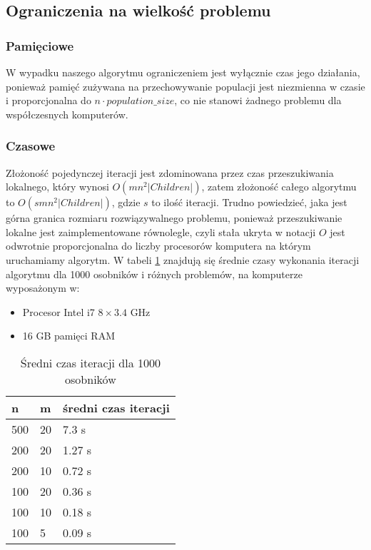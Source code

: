\documentclass[11pt, a4wide]{article}
\begin{document}
\subsection{Ograniczenia na wielkość problemu}
\subsubsection{Pamięciowe}
W wypadku naszego algorytmu ograniczeniem jest wyłącznie czas jego działania, ponieważ
pamięć zużywana na przechowywanie populacji jest niezmienna w czasie i proporcjonalna do
$n \cdot population\_size$, co nie stanowi żadnego problemu dla współczesnych komputerów.
\subsubsection{Czasowe}
Złożoność pojedynczej iteracji jest zdominowana przez czas przeszukiwania lokalnego, który wynosi
$O(mn^2|Children|)$, zatem złożoność całego algorytmu to $O(smn^2|Children|)$, gdzie $s$ to ilość iteracji.
Trudno powiedzieć, jaka jest górna granica rozmiaru rozwiązywalnego problemu, ponieważ przeszukiwanie 
lokalne jest zaimplementowane równolegle, czyli stała ukryta w notacji $O$ jest odwrotnie proporcjonalna
do liczby procesorów komputera na którym uruchamiamy algorytm. W tabeli \ref{sredniaiteracja} znajdują się 
średnie czasy wykonania iteracji algorytmu dla 1000 osobników i różnych problemów, na komputerze wyposażonym w:
\begin{itemize}
  \item Procesor Intel i7 $8 \times \text{3.4 GHz}$
  \item 16 GB pamięci RAM
\end{itemize}

\begin{table}[H]
\caption{Średni czas iteracji dla 1000 osobników}
\label{sredniaiteracja}
\begin{center}
\begin{tabular}{|l|l|l|}
  \hline
  n & m & średni czas iteracji \\
  \hline
  500 & 20 & 7.3 s \\
  200 & 20 & 1.27 s \\
  200 & 10 & 0.72 s \\
  100 & 20 & 0.36 s \\
  100 & 10 & 0.18 s \\
  100 & 5 & 0.09 s \\
  \hline
\end{tabular}
\end{center}
\end{table}
\end{document}
